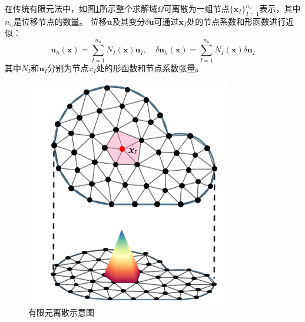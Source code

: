 在传统有限元法中，如图\ref{fem}所示整个求解域$\Omega$可离散为一组节点$\{\boldsymbol x_I\}_{I=1}^{n_u}$表示\cite{hughes2000}，其中$n_u$是位移节点的数量。
位移$\boldsymbol u$及其变分$\delta \boldsymbol u $可通过$\boldsymbol x_I$处的节点系数和形函数进行近似：
\begin{equation}\label{u_h}
    \boldsymbol u_h(\boldsymbol x) = \sum_{I=1}^{n_u} N_I(\boldsymbol x) \boldsymbol u_I, \quad
    \delta \boldsymbol u_h(\boldsymbol x) = \sum_{I=1}^{n_u} N_I(\boldsymbol x) \delta \boldsymbol u_I
\end{equation}
其中$N_I$和$\boldsymbol u_I$分别为节点$x_I$处的形函数和节点系数张量。
\begin{figure}[H]
    \centering 
        \includegraphics[scale=1.5]{figures/fem.png}
        \caption{有限元离散示意图}\label{fem}
\end{figure}

